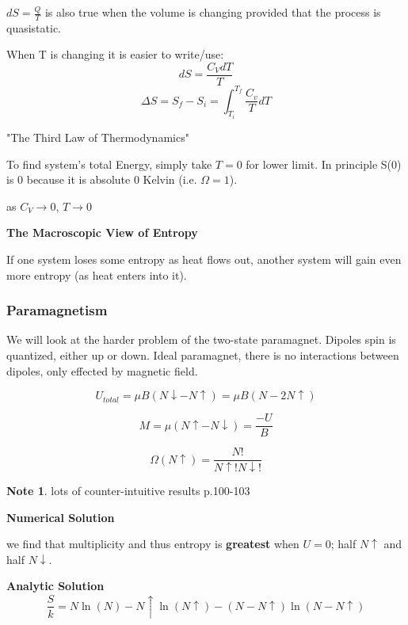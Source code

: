 \documentclass[11pt]{article}
\theoremstyle{definition}
\newtheorem{note}{Note}
\begin{document}
$dS = \frac{Q}{T}$ is also true when the volume is changing provided that the process is quasistatic.

When T is changing it is easier to write/use:
\[dS = \frac{C_V dT}{T}\]
\begin{equation}
 \Delta S = S_f - S_i = \int_{T_i}^{T_f} \frac{C_v}{T}dT
\end{equation}

"The Third Law of Thermodynamics"

To find system's total Energy, simply take $T=0$ for lower limit. In principle S(0) is 0 because it is absolute 0 Kelvin (i.e. $\Omega = 1$).

as $C_V \rightarrow 0$, $T \rightarrow 0$

\textbf{The Macroscopic View of Entropy}

If one system loses some entropy as heat flows out, another system will gain even more entropy (as heat enters into it).

\subsubsection{Paramagnetism}

We will look at the harder problem of the two-state paramagnet. Dipoles spin is quantized, either up or down. Ideal paramagnet, there is no interactions between dipoles, only effected by magnetic field.

\begin{equation}
    U_{total} = \mu B(N\downarrow - N\uparrow) = \mu B(N-2N\uparrow)
\end{equation}

\begin{equation}
    M = \mu (N\uparrow - N\downarrow) = \frac{-U}{B}
\end{equation}

\begin{equation}
    \Omega (N\uparrow) = \frac{N!}{N\uparrow!N\downarrow!}
\end{equation}

\begin{note}
lots of counter-intuitive results p.100-103
\end{note}

\textbf{Numerical Solution}

we find that multiplicity and thus entropy is \textbf{greatest} when $U = 0$; half $N\uparrow $ and half $N\downarrow$.

\textbf{Analytic Solution}
\begin{equation}
    \frac{S}{k} = N\ln(N) - N\uparrow \ln(N\uparrow) - (N-N\uparrow)\ln(N-N\uparrow)
\end{equation}
\end{document}

